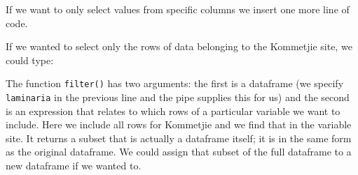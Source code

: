 \documentclass[]{book}
\newenvironment{Shaded}{\begin{snugshade}}{\end{snugshade}}
\newcommand{\KeywordTok}[1]{\textcolor[rgb]{0.13,0.29,0.53}{\textbf{#1}}}
\newcommand{\DecValTok}[1]{\textcolor[rgb]{0.00,0.00,0.81}{#1}}
\newcommand{\StringTok}[1]{\textcolor[rgb]{0.31,0.60,0.02}{#1}}
\newcommand{\CommentTok}[1]{\textcolor[rgb]{0.56,0.35,0.01}{\textit{#1}}}
\newcommand{\OperatorTok}[1]{\textcolor[rgb]{0.81,0.36,0.00}{\textbf{#1}}}
\newcommand{\NormalTok}[1]{#1}
\theoremstyle{definition}
\theoremstyle{definition}
\theoremstyle{definition}
\theoremstyle{remark}
\begin{document}
\begin{Shaded}
\end{Shaded}

If we want to only select values from specific columns we insert one
more line of code.

\begin{Shaded}
\end{Shaded}

If we wanted to select only the rows of data belonging to the Kommetjie
site, we could type:

\begin{Shaded}
\end{Shaded}

The function \texttt{filter()} has two arguments: the first is a
dataframe (we specify \texttt{laminaria} in the previous line and the
pipe supplies this for us) and the second is an expression that relates
to which rows of a particular variable we want to include. Here we
include all rows for Kommetjie and we find that in the variable site. It
returns a subset that is actually a dataframe itself; it is in the same
form as the original dataframe. We could assign that subset of the full
dataframe to a new dataframe if we wanted to.

\begin{Shaded}
\end{Shaded}
\end{document}
